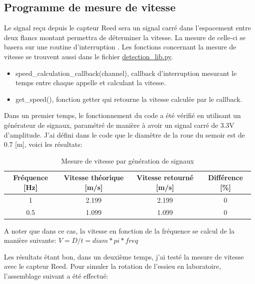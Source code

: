 \subsection{Programme de mesure de vitesse}
Le signal reçu depuis le capteur Reed sera un signal carré dans l'espacement entre deux flancs montant permettra de déterminer la vitesse. La mesure de celle-ci
se basera sur une routine d'interruption \cite{ed_raspberry_2020}. Les fonctions concernant la mesure de vitesse se trouvent aussi dans le fichier \underline{detection\_lib.py}.
\begin{itemize}
    \item speed\_calculation\_callback(channel), callback d'interruption mesurant le temps entre chaque appelle et calculant la vitesse.
    \item get\_speed(), fonction getter qui retourne la vitesse calculée par le callback.
\end{itemize}


Dans un premier temps, le fonctionnement du code a été vérifié en utilisant un générateur de signaux, paramétré de manière à avoir un signal carré de 3.3V d'amplitude.
J'ai défini dans le code que le diamètre de la roue du semoir est de 0.7 [m], voici les résultats:

\begin{table}[h]
    \begin{center}
        \caption{Mesure de vitesse par génération de signaux}
        \begin{tabular}{|c|c|c|c|}
            Fréquence [Hz] & Vitesse théorique [m/s] & Vitesse retourné [m/s] & Différence  [\%] \\ \hline
            1              & 2.199                   & 2.199                  & 0                \\
            0.5            & 1.099                   & 1.099                  & 0                \\
        \end{tabular}
    \end{center}

    A noter que dans ce cas, la vitesse en fonction de la fréquence se calcul de la manière suivante: \(V = D / t = diam*pi*freq\)
\end{table}

Les résultats étant bon, dans un deuxième temps, j'ai testé la mesure de vitesse avec le capteur Reed. Pour simuler la rotation de l'essieu en laboratoire,
l'assemblage suivant a été effectué:

